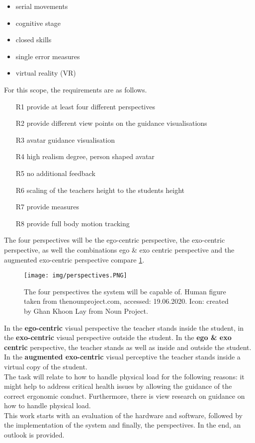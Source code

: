 \begin{itemize}
	\item serial movements
	\item cognitive stage
	\item closed skills
	\item single error measures
	\item virtual reality (VR)
\end{itemize}
For this scope, the requirements are as follows.
\begin{itemize}
	\item[R1] provide at least four different perspectives
	\item[R2] provide different view points on the guidance visualisations
	\item[R3] avatar guidance visualisation
	\item[R4] high realism degree, person shaped avatar
	\item[R5] no additional feedback
	\item[R6] scaling of the teachers height to the students height
	\item[R7] provide measures
	\item[R8] provide full body motion tracking
\end{itemize}
The four perspectives will be the ego-centric perspective, the exo-centric perspective, as well the combinations ego \& exo centric perspective and the augmented exo-centric perspective compare \ref{fig:perspectives}.
\begin{figure}
	\centering
	\texttt{[image: img/perspectives.PNG]}
	\caption{The four perspectives the system will be capable of. Human figure taken from thenounproject.com, accessed: 19.06.2020. Icon: created by Ghan Khoon Lay from Noun Project.}
	\label{fig:perspectives}
\end{figure}
In the \textbf{ego-centric} visual perspective the teacher stands inside the student, in the \textbf{exo-centric} visual perspective outside the student. In the \textbf{ego \& exo centric} perspective, the teacher stands as well as inside and outside the student. In the \textbf{augmented exo-centric} visual perceptive the teacher stands inside a virtual copy of the student.\\
The task will relate to how to handle physical load for the following reasons: it might help to address critical health issues by allowing the guidance of the correct ergonomic conduct. Furthermore, there is view research on guidance on how to handle physical load.\\
This work starts with an evaluation of the hardware and software, followed by the implementation of the system and finally, the perspectives. In the end, an outlook is provided.

